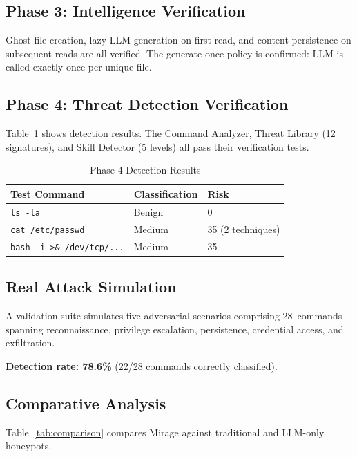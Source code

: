 \documentclass[conference]{IEEEtran}
\begin{document}
\subsection{Phase 3: Intelligence Verification}

Ghost file creation, lazy LLM generation on first read, and content persistence on subsequent reads are all verified.
The generate-once policy is confirmed: LLM is called exactly once per unique file.

\subsection{Phase 4: Threat Detection Verification}

Table~\ref{tab:detection} shows detection results.
The Command Analyzer, Threat Library (12 signatures), and Skill Detector (5 levels) all pass their verification tests.

\begin{table}[htbp]
\caption{Phase 4 Detection Results}
\label{tab:detection}
\centering
\footnotesize
\begin{tabular}{@{}lll@{}}
\toprule
\textbf{Test Command} & \textbf{Classification} & \textbf{Risk} \\
\midrule
\texttt{ls -la}              & Benign   & 0 \\
\texttt{cat /etc/passwd}     & Medium   & 35 (2 techniques) \\
\texttt{bash -i >\& /dev/tcp/...} & Medium & 35 \\
\bottomrule
\end{tabular}
\end{table}

\subsection{Real Attack Simulation}

A validation suite simulates five adversarial scenarios comprising 28~commands spanning reconnaissance, privilege escalation, persistence, credential access, and exfiltration.

\textbf{Detection rate: 78.6\%} (22/28 commands correctly classified).

\subsection{Comparative Analysis}

Table~\ref{tab:comparison} compares Mirage against traditional and LLM-only honeypots.
\end{document}
